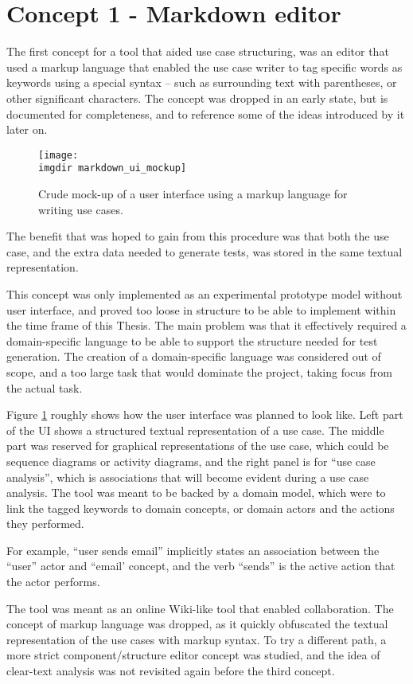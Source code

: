 \section{Concept 1 - Markdown editor}
The first concept for a tool that aided use case structuring, was an editor that used a markup language that enabled the use case writer to tag specific words as keywords using a special syntax -- such as surrounding text with parentheses, or other significant characters. The concept was dropped in an early state, but is documented for completeness, and to reference some of the ideas introduced by it later on.\medskip
\begin{figure}[!htbp]
  \centering
  \texttt{[image: \\imgdir markdown\_ui\_mockup]}
  \caption{Crude mock-up of a user interface using a markup language for writing use cases.}
\label{fig:markdown_ui_mockup}
\end{figure}
\noindent The benefit that was hoped to gain from this procedure was that both the use case, and the extra data needed to generate tests, was stored in the same textual representation.\medskip

\noindent This concept was only implemented as an experimental prototype model without user interface, and proved too loose in structure to be able to implement within the time frame of this Thesis. The main problem was that it effectively required a domain-specific language to be able to support the structure needed for test generation. The creation of a domain-specific language was considered out of scope, and a too large task that would dominate the project, taking focus from the actual task.\medskip

\noindent Figure \ref{fig:markdown_ui_mockup} roughly shows how the user interface was planned to look like. Left part of the UI shows a structured textual representation of a use case. The middle part was reserved for graphical representations of the use case, which could be sequence diagrams or activity diagrams, and the right panel is for ``use case analysis'', which is associations that will become evident during a use case analysis. The tool was meant to be backed by a domain model, which were to link the tagged keywords to domain concepts, or domain actors and the actions they performed.\medskip

\noindent For example, ``user sends email'' implicitly states an association between the ``user'' actor and ``email' concept, and the verb ``sends'' is the active action that the actor performs.\medskip

\noindent The tool was meant as an online Wiki-like tool that enabled collaboration. The concept of markup language was dropped, as it quickly obfuscated the textual representation of the use cases with markup syntax. To try a different path, a more strict component/structure editor concept was studied, and the idea of clear-text analysis was not revisited again before the third concept.

